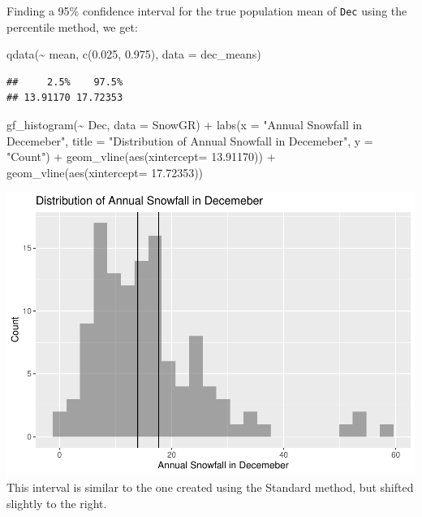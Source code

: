 \documentclass[12pt]{article}
\newenvironment{Shaded}{\begin{snugshade}}{\end{snugshade}}
\newcommand{\AttributeTok}[1]{\textcolor[rgb]{0.77,0.63,0.00}{#1}}
\newcommand{\FloatTok}[1]{\textcolor[rgb]{0.00,0.00,0.81}{#1}}
\newcommand{\FunctionTok}[1]{\textcolor[rgb]{0.00,0.00,0.00}{#1}}
\newcommand{\NormalTok}[1]{#1}
\newcommand{\SpecialCharTok}[1]{\textcolor[rgb]{0.00,0.00,0.00}{#1}}
\newcommand{\StringTok}[1]{\textcolor[rgb]{0.31,0.60,0.02}{#1}}
\begin{document}
Finding a 95\% confidence interval for the true population mean of
\texttt{Dec} using the percentile method, we get:

\begin{Shaded}
\begin{Highlighting}[]
\FunctionTok{qdata}\NormalTok{(}\SpecialCharTok{\textasciitilde{}}\NormalTok{ mean, }\FunctionTok{c}\NormalTok{(}\FloatTok{0.025}\NormalTok{, }\FloatTok{0.975}\NormalTok{), }\AttributeTok{data =}\NormalTok{ dec\_means)}
\end{Highlighting}
\end{Shaded}

\begin{verbatim}
##     2.5%    97.5% 
## 13.91170 17.72353
\end{verbatim}

\begin{Shaded}
\begin{Highlighting}[]
\FunctionTok{gf\_histogram}\NormalTok{(}\SpecialCharTok{\textasciitilde{}}\NormalTok{ Dec, }\AttributeTok{data =}\NormalTok{ SnowGR) }\SpecialCharTok{+}
  \FunctionTok{labs}\NormalTok{(}\AttributeTok{x =} \StringTok{"Annual Snowfall in Decemeber"}\NormalTok{, }\AttributeTok{title =} \StringTok{"Distribution of Annual Snowfall in Decemeber"}\NormalTok{, }\AttributeTok{y =} \StringTok{"Count"}\NormalTok{) }\SpecialCharTok{+}
  \FunctionTok{geom\_vline}\NormalTok{(}\FunctionTok{aes}\NormalTok{(}\AttributeTok{xintercept=} \FloatTok{13.91170}\NormalTok{)) }\SpecialCharTok{+}
  \FunctionTok{geom\_vline}\NormalTok{(}\FunctionTok{aes}\NormalTok{(}\AttributeTok{xintercept=} \FloatTok{17.72353}\NormalTok{))}
\end{Highlighting}
\end{Shaded}

\includegraphics{paper_files/figure-latex/unnamed-chunk-7-1.pdf} This
interval is similar to the one created using the Standard method, but
shifted slightly to the right.
\end{document}
